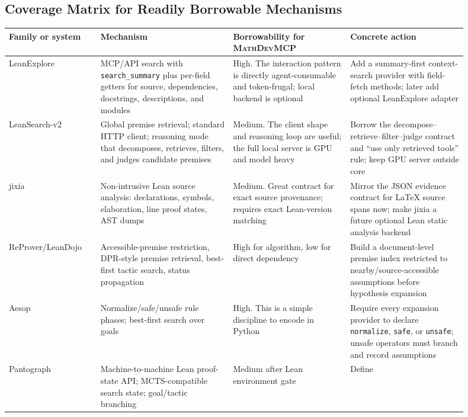 \documentclass[11pt]{article}
\newcommand{\MathDevMCP}{\textsc{MathDevMCP}}
\begin{document}
\subsection{Coverage Matrix for Readily Borrowable Mechanisms}

\begin{small}
\begin{longtable}{p{0.18\linewidth}p{0.26\linewidth}p{0.23\linewidth}p{0.23\linewidth}}
\toprule
Family or system & Mechanism & Borrowability for \MathDevMCP{} & Concrete action \\
\midrule
\endhead
LeanExplore & MCP/API search with \texttt{search\_summary} plus per-field
getters for source, dependencies, docstrings, descriptions, and modules &
High. The interaction pattern is directly agent-consumable and token-frugal;
local backend is optional & Add a summary-first context-search provider with
field-fetch methods; later add optional LeanExplore adapter \\
\addlinespace
LeanSearch-v2 & Global premise retrieval; standard HTTP client; reasoning mode
that decomposes, retrieves, filters, and judges candidate premises & Medium.
The client shape and reasoning loop are useful; the full local server is GPU
and model heavy & Borrow the decompose--retrieve--filter--judge contract and
``use only retrieved tools'' rule; keep GPU server outside core \\
\addlinespace
jixia & Non-intrusive Lean source analysis: declarations, symbols, elaboration,
line proof states, AST dumps & Medium. Great contract for exact source
provenance; requires exact Lean-version matching & Mirror the JSON evidence
contract for LaTeX source spans now; make jixia a future optional Lean static
analysis backend \\
\addlinespace
ReProver/LeanDojo & Accessible-premise restriction, DPR-style premise
retrieval, best-first tactic search, status propagation & High for algorithm,
low for direct dependency & Build a document-level premise index restricted to
nearby/source-accessible assumptions before hypothesis expansion \\
\addlinespace
Aesop & Normalize/safe/unsafe rule phases; best-first search over goals &
High. This is a simple discipline to encode in Python & Require every expansion
provider to declare \texttt{normalize}, \texttt{safe}, or \texttt{unsafe};
unsafe operators must branch and record assumptions \\
\addlinespace
Pantograph & Machine-to-machine Lean proof-state API; MCTS-compatible search
state; goal/tactic branching & Medium after Lean environment gate & Define

\end{longtable}
\end{small}
\end{document}

